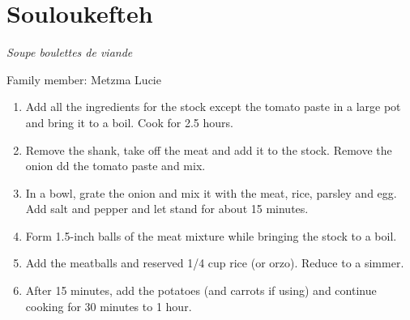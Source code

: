 \chapter{Souloukefteh}
\label{ch:souloukefteh}


\textit{Soupe boulettes de viande}

Family member: Metzma Lucie

\begin{enumerate}
    \item Add all the ingredients for the stock except the tomato paste in a large pot and bring it to a boil. Cook for 2.5 hours.
    \item Remove the shank, take off the meat and add it to the stock. Remove the onion dd the tomato paste and mix.
    \item In a bowl, grate the onion and mix it with the meat, rice, parsley and egg. Add salt and pepper and let stand for about 15 minutes.
    \item Form 1.5-inch balls of the meat mixture while bringing the stock to a boil.
    \item Add the meatballs and reserved 1/4 cup rice (or orzo). Reduce to a simmer.
    \item After 15 minutes, add the potatoes (and carrots if using) and continue cooking for 30 minutes to 1 hour.
\end{enumerate}
